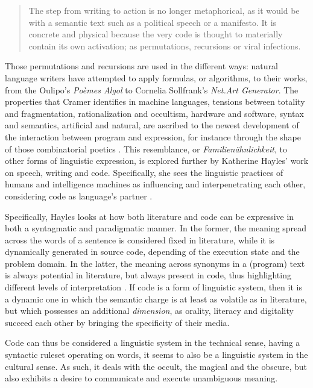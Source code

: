 \begin{quote}
  The step from writing to action is no longer metaphorical, as it would be with a semantic text such as a political speech or a manifesto. It is concrete and physical because the very code is thought to materially contain its own activation; as permutations, recursions or viral infections. \citep{cramer_words_2003}
\end{quote}

Those permutations and recursions are used in the different ways: natural language writers have attempted to apply formulas, or algorithms, to their works, from the Oulipo's \emph{Poèmes Algol} to Cornelia Sollfrank's \emph{Net.Art Generator}. The properties that Cramer identifies in machine languages, tensions between totality and fragmentation, rationalization and occultism, hardware and software, syntax and semantics, artificial and natural, are ascribed to the newest development of the interaction between program and expression, for instance through the shape of those combinatorial poetics \citep{cramer_words_2003}. This resemblance, or \emph{Familienähnlichkeit}, to other forms of linguistic expression, is explored further by Katherine Hayles' work on speech, writing and code. Specifically, she sees the linguistic practices of humans and intelligence machines as influencing and interpenetrating each other, considering code as language's partner \citep{hayles_print_2004}.

Specifically, Hayles looks at how both literature and code can be expressive in both a syntagmatic and paradigmatic manner. In the former, the meaning spread across the words of a sentence is considered fixed in literature, while it is dynamically generated in source code, depending of the execution state and the problem domain. In the latter, the meaning across synonyms in a (program) text is always potential in literature, but always present in code, thus highlighting different levels of interpretation \citep{hayles_print_2004}. If code is a form of linguistic system, then it is a dynamic one in which the semantic charge is at least as volatile as in literature, but which possesses an additional \emph{dimension}, as orality, literacy and digitality succeed each other by bringing the specificity of their media.

Code can thus be considered a linguistic system in the technical sense, having a syntactic ruleset operating on words, it seems to also be a linguistic system in the cultural sense. As such, it deals with the occult, the magical and the obscure, but also exhibits a desire to communicate and execute unambiguous meaning.

